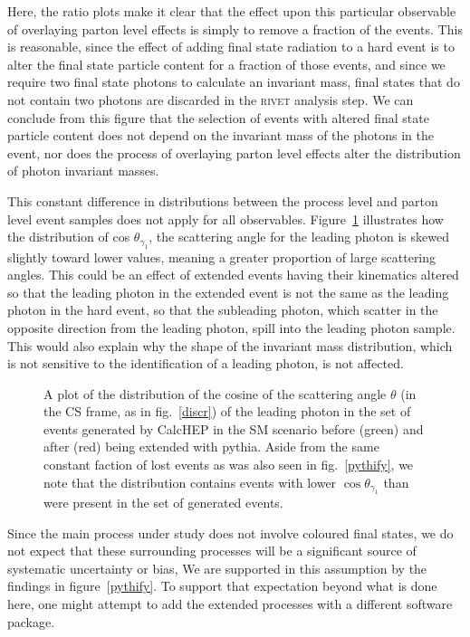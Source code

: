 Here, the ratio plots make it clear that the effect upon this particular observable of overlaying parton level effects is simply to remove a fraction of the events. This is reasonable, since the effect of adding final state radiation to a hard event is to alter the final state particle content for a fraction of those events, and since we require two final state photons to calculate an invariant mass, final states that do not contain two photons are discarded in the \textsc{rivet} analysis step. We can conclude from this figure that the selection of events with altered final state particle content does not depend on the invariant mass of the photons in the event, nor does the process of overlaying parton level effects alter the distribution of photon invariant masses.

This constant difference in distributions between the process level and parton level event samples does not apply for all observables. Figure~\ref{pythicos} illustrates how the distribution of cos $\theta_{\gamma_1}$, the scattering angle for the leading photon is skewed slightly toward lower values, meaning a greater proportion of large scattering angles. This could be an effect of extended events having their kinematics altered so that the leading photon in the extended event is not the same as the leading photon in the hard event, so that the subleading photon, which scatter in the opposite direction from the leading photon, spill into the leading photon sample. This would also explain why the shape of the invariant mass distribution, which is not sensitive to the identification of a leading photon, is not affected.

\begin{figure}[htp]
\begin{minipage}[b]{.65\textwidth}
\begin{infilsf} \tiny \makebox[0pt][l]{
\hspace{-1em}
}\end{infilsf}
\end{minipage}
\hfill\begin{minipage}[b]{.3\textwidth}
\caption{A plot of the distribution of the cosine of the scattering angle $\theta$ (in the CS frame, as in fig.~\ref{discr}) of the leading photon in the set of events generated by CalcHEP in the SM scenario before (green) and after (red) being extended with pythia. Aside from the same constant faction of lost events as was also seen in fig.~\ref{pythify}, we note that the distribution contains events with lower $\cos\theta_{\gamma_1}$ than were present in the set of generated events.
\label{pythicos}}
\end{minipage}
\end{figure}

Since the main process under study does not involve coloured final states, we do not expect that these surrounding processes will be a significant source of systematic uncertainty or bias, We are supported in this assumption by the findings in figure~\ref{pythify}. To support that expectation beyond what is done here, one might attempt to add the extended processes with a different software package.

